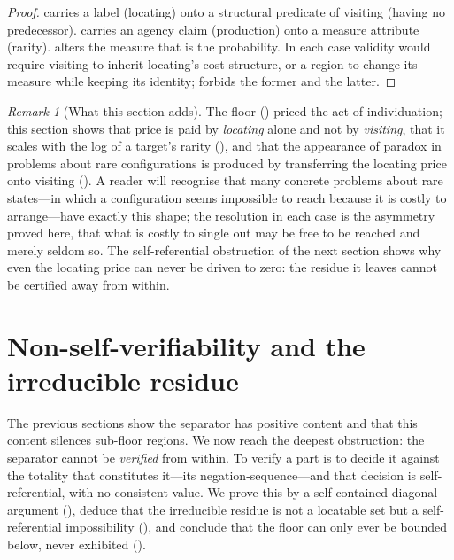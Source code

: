 \documentclass[11pt,a4paper]{article}
\theoremstyle{thmstyle}
\theoremstyle{definition}
\theoremstyle{remark}
\newtheorem{remark}[theorem]{Remark}
\begin{document}
\begin{proof}
 carries a label (locating) onto a structural predicate of
visiting (having no predecessor).  carries an agency claim
(production) onto a measure attribute (rarity).  alters
the measure that is the probability. In each case validity would require visiting
to inherit locating's cost-structure, or a region to change its measure while
keeping its identity;  forbids the former and
 the latter.
\end{proof}

\begin{remark}[What this section adds]
\label{rem:locating-adds}
The floor () priced the act of individuation; this
section shows that price is paid by \emph{locating} alone and not by
\emph{visiting}, that it scales with the log of a target's rarity
(), and that the appearance of paradox in problems about
rare configurations is produced by transferring the locating price onto visiting
(). A reader will recognise that many concrete problems about
rare states---in which a configuration seems impossible to reach because it is
costly to arrange---have exactly this shape; the resolution in each case is the
asymmetry proved here, that what is costly to single out may be free to be reached
and merely seldom so. The self-referential obstruction of the next section shows
why even the locating price can never be driven to zero: the residue it leaves
cannot be certified away from within.
\end{remark}


\section{Non-self-verifiability and the irreducible residue}
\label{sec:residue}

The previous sections show the separator has positive content and that this
content silences sub-floor regions. We now reach the deepest obstruction: the
separator cannot be \emph{verified} from within. To verify a part is to decide it
against the totality that constitutes it---its negation-sequence---and that
decision is self-referential, with no consistent value. We prove this by a
self-contained diagonal argument (), deduce that the
irreducible residue is not a locatable set but a self-referential impossibility
(), and conclude that the floor can only ever be
bounded below, never exhibited ().
\end{document}
